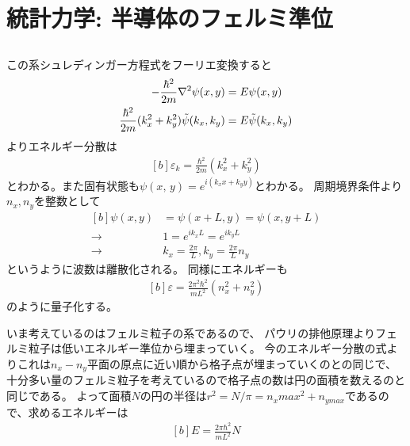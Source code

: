 \documentclass[../../master.tex]{subfiles}
\begin{document}
\section{統計力学: 半導体のフェルミ準位}
\subsection{}
この系シュレディンガー方程式をフーリエ変換すると
\begin{equation}\begin{aligned}[b]
    -\frac{\hbar^2}{2m}\laplacian\psi(x,y)&=E\psi(x,y)\\
    \frac{\hbar^2}{2m}(k_x^2+k_y^2)\tilde{\psi}(k_x,k_y) &= E \tilde{\psi}(k_x,k_y)
\end{aligned}\end{equation}
よりエネルギー分散は
\begin{equation}\begin{aligned}[b]
    \varepsilon_k = \frac{\hbar^2}{2m}(k_x^2+k_y^2)
\end{aligned}\end{equation}
とわかる。また固有状態も\(\psi(x,\,y)=e^{i(k_xx+k_yy)}\)とわかる。
周期境界条件より\(n_x,n_y\)を整数として
\begin{equation}\begin{aligned}[b]
    \psi(x,y) &= \psi(x+L,y) = \psi(x,y+L)\\
    \rightarrow\quad& 1 = e^{ik_xL} = e^{ik_y L}\\
    \rightarrow\quad& k_x = \frac{2\pi}{L},  k_y = \frac{2\pi}{L}n_y
\end{aligned}\end{equation}
というように波数は離散化される。
同様にエネルギーも
\begin{equation}\begin{aligned}[b]
    \varepsilon = \frac{2\pi^2\hbar^2}{mL^2}(n_x^2+n_y^2)
\end{aligned}\end{equation}
のように量子化する。

いま考えているのはフェルミ粒子の系であるので、
パウリの排他原理よりフェルミ粒子は低いエネルギー準位から埋まっていく。
今のエネルギー分散の式よりこれは\(n_x-n_y\)平面の原点に近い順から格子点が埋まっていくのとの同じで、
十分多い量のフェルミ粒子を考えているので格子点の数は円の面積を数えるのと同じである。
よって面積\(N\)の円の半径は\(r^2 = N/\pi = n_x{max}^2+n_{ymax}\)であるので、求めるエネルギーは
\begin{equation}\begin{aligned}[b]
    E = \frac{2\pi\hbar^2}{mL^2}N
\end{aligned}\end{equation}
\end{document}
